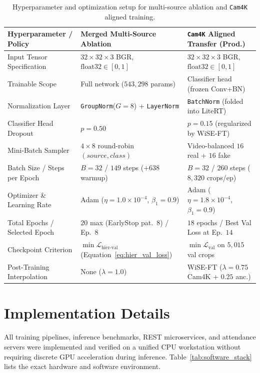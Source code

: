 \begin{table}[htbp]
\centering
\caption{Hyperparameter and optimization setup for multi-source ablation and \texttt{Cam4K} aligned training.}
\label{tab:hyperparams}
\small
\begin{tabular}{L{4.4cm}L{4.8cm}L{4.8cm}}
\toprule
\textbf{Hyperparameter / Policy} & \textbf{Merged Multi-Source Ablation} & \textbf{\texttt{Cam4K} Aligned Transfer (Prod.)} \\
\midrule
Input Tensor Specification & $32 \times 32 \times 3$ BGR, $\text{float32} \in [0, 1]$ & $32 \times 32 \times 3$ BGR, $\text{float32} \in [0, 1]$ \\
Trainable Scope & Full network ($543{,}298$ params) & Classifier head (frozen Conv+BN) \\
Normalization Layer & \texttt{GroupNorm}($G=8$) + \texttt{LayerNorm} & \texttt{BatchNorm} (folded into LiteRT) \\
Classifier Head Dropout & $p = 0.50$ & $p = 0.15$ (regularized by WiSE-FT) \\
Mini-Batch Sampler & $4 \times 8$ round-robin $(source, class)$ & Video-balanced $16$ real + $16$ fake \\
Batch Size / Steps per Epoch & $B = 32$ / $149$ steps ($+638$ warmup) & $B = 32$ / $260$ steps ($8{,}320$ crops/ep) \\
Optimizer \& Learning Rate & Adam ($\eta = 1.0 \times 10^{-4}$, $\beta_1 = 0.9$) & Adam ($\eta = 1.8 \times 10^{-4}$, $\beta_1 = 0.9$) \\
Total Epochs / Selected Epoch & $20$ max (EarlyStop pat.\ $8$) / Ep.\ $8$ & $18$ epochs / Best Val Loss at Ep.\ $14$ \\
Checkpoint Criterion & $\min \mathcal{L}_{\text{hier-val}}$ (Equation~\eqref{eq:hier_val_loss}) & $\min \mathcal{L}_{\text{val}}$ on $5{,}015$ val crops \\
Post-Training Interpolation & None ($\lambda = 1.0$) & WiSE-FT ($\lambda = 0.75$ Cam4K + $0.25$ anc.) \\
\bottomrule
\end{tabular}
\end{table}

\section{Implementation Details}
\label{sec:implementation_details}

All training pipelines, inference benchmarks, REST microservices, and attendance servers were implemented and verified on a unified CPU workstation without requiring discrete GPU acceleration during inference. Table~\ref{tab:software_stack} lists the exact hardware and software environment.

